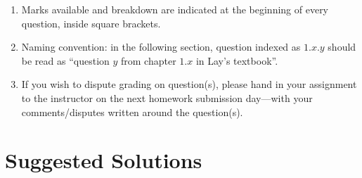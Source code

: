 \documentclass{amsart}
\theoremstyle{definition}
\theoremstyle{definition}
\DeclareMathOperator{\1}{\mathbbm{1}}
\begin{document}
\begin{enumerate}[itemsep=.75em]
	\item Marks available and breakdown are indicated at the beginning of every question, inside square brackets. 
	
	\item Naming convention: in the following section, question indexed as $1.x.y$ should be read as ``question $y$ from chapter $1.x$ in Lay's textbook''.
	
	\item If you wish to dispute grading on question(s), please hand in your assignment to the instructor on the next homework submission day---with your comments/disputes written around the question(s).
	
\end{enumerate}



\clearpage

\section*{Suggested Solutions}

\bigskip
\end{document}

